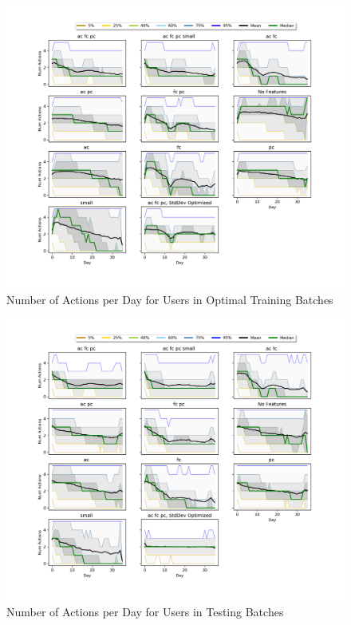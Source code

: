 	\begin{figure}[H]
	\includegraphics[width=1.5\textwidth,center]{figures/QM7train.png}%
	\caption{Number of Actions per Day for Users in Optimal Training Batches}
	\label{QM7train}
	\end{figure}

	\begin{figure}[H]
	\includegraphics[width=1.5\textwidth,center]{figures/QM7test.png}%
	\caption{Number of Actions per Day for Users in Testing Batches}
	\label{QM7test}
	\end{figure}

